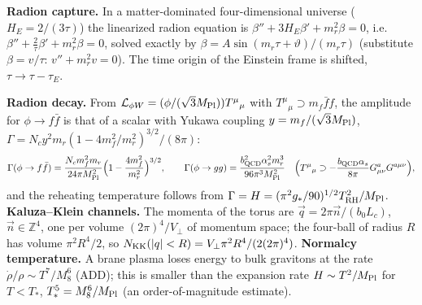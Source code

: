 \documentclass[10pt,a4paper]{article}
\begin{document}
\textbf{Radion capture.} In a matter-dominated four-dimensional universe ($H_E=2/(3\tau)$) the linearized radion equation is $\beta''+3H_E\beta'+m_r^2\beta=0$, i.e. $\beta''+\frac2\tau\beta'+m_r^2\beta=0$, solved exactly by $\beta=A\sin(m_r\tau+\vartheta)/(m_r\tau)$ (substitute $\beta=v/\tau$: $v''+m_r^2v=0$). The time origin of the Einstein frame is shifted, $\tau\to\tau-\tau_E$.

\textbf{Radion decay.} From $\mathcal L_{\phi W}=(\phi/(\sqrt3M_{\rm Pl}))T^\mu{}_\mu$ with $T^\mu{}_\mu\supset m_f\bar ff$, the amplitude for $\phi\to f\bar f$ is that of a scalar with Yukawa coupling $y=m_f/(\sqrt3M_{\rm Pl})$, $\Gamma=N_cy^2m_r(1-4m_f^2/m_r^2)^{3/2}/(8\pi)$:
\begin{equation*}
\Gamma(\phi\to f\bar f)=\frac{N_cm_f^2m_r}{24\pi M_{\rm Pl}^2}\Big(1-\frac{4m_f^2}{m_r^2}\Big)^{3/2},\qquad \Gamma(\phi\to gg)=\frac{b_{\rm QCD}^2\alpha_s^2m_r^3}{96\pi^3M_{\rm Pl}^2}\quad\Big(T^\mu{}_\mu\supset-\frac{b_{\rm QCD}\alpha_s}{8\pi}G^a_{\mu\nu}G^{a\mu\nu}\Big),
\end{equation*}
and the reheating temperature follows from $\Gamma=H=(\pi^2g_*/90)^{1/2}T_{\rm RH}^2/M_{\rm Pl}$. \textbf{Kaluza–Klein channels.} The momenta of the torus are $\vec q=2\pi\vec n/(b_0L_c)$, $\vec n\in\mathbb Z^4$, one per volume $(2\pi)^4/V_\perp$ of momentum space; the four-ball of radius $R$ has volume $\pi^2R^4/2$, so $N_{\rm KK}(|q|<R)=V_\perp\pi^2R^4/(2(2\pi)^4)$. \textbf{Normalcy temperature.} A brane plasma loses energy to bulk gravitons at the rate $\dot\rho/\rho\sim T^7/M_8^6$ (ADD); this is smaller than the expansion rate $H\sim T^2/M_{\rm Pl}$ for $T<T_*$, $T_*^5=M_8^6/M_{\rm Pl}$ (an order-of-magnitude estimate).
\end{document}

